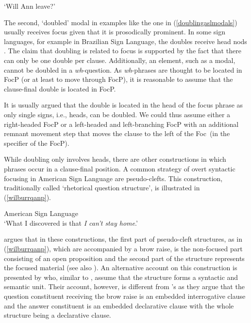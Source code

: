\begin{exe}
\ex {}
\glt `Will Ann leave?' \label{doublingaslmodals}
\end{exe}

\noindent The second, `doubled' modal in examples like the one in (\ref{doublingaslmodals}) usually receives focus given that it is prosodically prominent. In some sign languages, for example in Brazilian Sign Language, the doubles receive head nods \citep{de1999phrase}. The claim that doubling is related to focus is supported by the fact that there can only be one double per clause. Additionally, an element, such as a modal, cannot be doubled in a \textit{wh}-question. As \textit{wh}-phrases are thought to be located in FocP (or at least to move through FocP), it is reasonable to assume that the clause-final double is located in FocP. 

It is usually argued that the double is located in the head of the focus phrase as only single signs, i.e., heads, can be doubled. We could thus assume either a right-headed FocP or a left-headed and left-branching FocP with an additional remnant movement step that moves the clause to the left of the Foc\textdegree\ (in the specifier of the FocP).  

While doubling only involves heads, there are other constructions in which phrases occur in a clause-final position. \label{pseudocleeeeefts}A common strategy of overt syntactic focusing in American Sign Language are pseudo-clefts. This construction, traditionally called `rhetorical question structure', is illustrated in (\ref{wilburrqanp}).

\begin{exe}
\ex American Sign Language \citep[92]{wilbur1997prosodic} \\  
\glt `What I discovered is that \textit{I can't stay home}.' \label{wilburrqanp}
\end{exe}

\noindent \citet{wilbur1997prosodic} argues that in these constructions, the first part of pseudo-cleft structures, as in (\ref{wilburrqanp}), which are accompanied by a brow raise, is the non-focused part consisting of an open proposition and the second part of the structure represents the focused material (see also \citealt{wilbur1994foregrounding, wilbur1996evidence}). An alternative account on this construction is presented by \citet{caponigro2011ask} who, similar to \citet{wilbur1996evidence}, assume that the structure forms a syntactic and semantic unit. Their account, however, is different from \citeauthor{wilbur1996evidence}'s as they argue that the question constituent receiving the brow raise is an embedded interrogative clause and the answer constituent is an embedded declarative clause with the whole structure being a declarative clause. 

